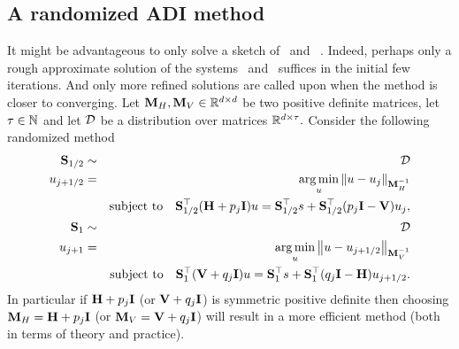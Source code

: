 \documentclass[10pt]{article}
\makeatletter
\renewcommand*{\eqref}[1]{%
  \hyperref[{#1}]{\textup{\tagform@{\ref*{#1}}}}%
}
\theoremstyle{definition}
\newcommand{\rob}[1]{\todo[inline]{\textbf{Robert: }#1}}
\newcommand{\nid}[1]{\todo[inline]{\textbf{Nidham: }#1}}
\makeatother
\begin{document}

\subsection{A randomized ADI method}

It might be advantageous to only solve a sketch of~\eqref{eq:ujplushalf} and~\eqref{eq:ujplus1}. Indeed, perhaps only a rough approximate solution of the systems~\eqref{eq:ujplushalf} and~\eqref{eq:ujplus1} suffices in the initial few iterations. And only more refined solutions are called upon when the method is closer to converging.
Let ${\bf M}_H, {\bf M}_V \in \mathbb{R}^{d\times d}$ be two positive definite matrices, let $\tau \in \mathbb{N}$ and let ${\cal D}$ be a distribution over matrices $\mathbb{R}^{d \times \tau}.$ Consider the following randomized method
\begin{eqnarray}
    {\bf S}_{1/2} & \sim & {\cal D} \nonumber \\
    u_{j+1/2} &=& \operatorname*{arg\,min}_{u} \left\| u-u_j \right\|_{{\bf M}_H^{-1}} \nonumber\\
    && \mbox{subject to} \quad {\bf S}_{1/2}^\top ({\bf H}+p_j{\bf I}) u = {\bf S}_{1/2}^\top  s+{\bf S}_{1/2}^\top (p_j{\bf I}-{\bf V}) u_j,   \label{eq:ujplushalfsketch}  \\
    {\bf S}_{1} & \sim & {\cal D} \nonumber \\
    u_{j+1} &=&\operatorname*{arg\,min}_{u} \left\| u-u_{j+1/2} \right\|_{{\bf M}_V^{-1}} \nonumber\\
    && \mbox{subject to} \quad {\bf S}_{1}^\top  ({\bf V}+ q_j {\bf I} )u = {\bf S}_{1}^\top s+{\bf S}_{1}^\top (q_j{\bf I} -{\bf H}) u_{j+1/2}.\label{eq:ujplus1sketch}
\end{eqnarray}
In particular if ${\bf H}+p_j{\bf I}$ (or ${\bf V}+ q_j{\bf I}$) is symmetric positive definite then choosing ${\bf M}_H = {\bf H}+p_j{\bf I}$ (or ${\bf M}_V = {\bf V}+ q_j{\bf I} $) will result in a more efficient method (both in terms of theory and practice).
\end{document}
